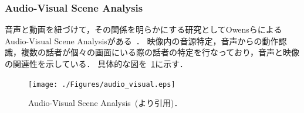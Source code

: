 \subsubsection{Audio-Visual Scene Analysis}
音声と動画を紐づけて，その関係を明らかにする研究としてOwensらによるAudio-Visual Scene Analysisがある~\cite{multisensory2018}．
映像内の音源特定，音声からの動作認識，複数の話者が個々の画面にいる際の話者の特定を行なっており，音声と映像の関連性を示している．
具体的な図を~\ref{audio_visual}に示す．
\begin{figure}[htbp]
 \begin{center}
  \texttt{[image: ./Figures/audio\_visual.eps]}
  \caption{Audio-Visual Scene Analysis~(\cite{multisensory2018}より引用)．}
  \label{audio_visual}
 \end{center}
\end{figure}
